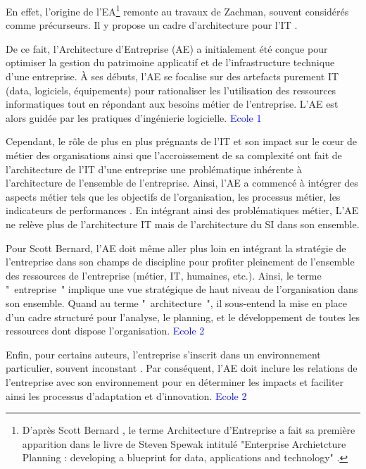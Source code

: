 En effet, l'origine de l'EA\footnote{D'après Scott Bernard 
\cite{bernard2012introduction}, le terme Architecture d'Entreprise a fait sa 
première apparition dans le livre de Steven Spewak intitulé "Enterprise 
Archietcture Planning : developing a blueprint for data, applications and 
technology" \cite{spewak1993enterprise}.} remonte au travaux de Zachman, souvent 
considérés comme précurseurs. Il y propose un cadre d'architecture pour l'IT 
\cite{zachman1987framework}.

De ce fait, l'Architecture d'Entreprise (AE) a initialement été conçue pour 
optimiser la 
gestion du patrimoine applicatif et de l'infrastructure technique d'une  
entreprise. À ses débuts, l'AE se 
focalise sur des artefacts purement IT (data, logiciels, équipements) pour 
rationaliser les l'utilisation des ressources informatiques 
\cite{winter2006essential} tout en répondant aux besoins métier de l'entreprise. 
L'AE est alors guidée par les pratiques d'ingénierie logicielle. 
\textcolor{blue}{Ecole 1} 
 

Cependant, le rôle de plus en plus prégnants de l'IT et son impact sur le 
c\oe{}ur de métier des organisations ainsi que l'accroissement de sa complexité 
\cite{ranganathan2005enterprise} ont fait de l'architecture de l'IT d'une 
entreprise une problématique inhérente à l'architecture de l'ensemble de 
l'entreprise. Ainsi, l'AE a commencé à intégrer des aspects métier tels que les 
objectifs de l'organisation, les processus métier, les indicateurs de 
performances \cite{winter2006essential}. En intégrant ainsi des problématiques 
métier, L'AE ne relève plus de l'architecture IT mais de l'architecture du SI 
dans son ensemble.

Pour Scott Bernard, l'AE doit même aller plus loin en intégrant la stratégie de 
l'entreprise \cite{bernard2012introduction} dans son champs de discipline pour 
profiter pleinement de l'ensemble des ressources de l'entreprise (métier, IT, 
humaines, etc.). Ainsi, le terme "~entreprise~" implique une vue stratégique de 
haut niveau de l'organisation dans son ensemble. Quand au terme 
"~architecture~", il sous-entend la mise en place d'un cadre structuré pour 
l'analyse, le planning, et le développement de toutes les ressources dont 
dispose l'organisation. \textcolor{blue}{Ecole 2} 

Enfin, pour certains auteurs, l'entreprise s'inscrit dans un environnement 
particulier, souvent inconstant \cite{lapalme2012three}. Par conséquent, l'AE 
doit inclure les relations de l'entreprise avec son environnement pour en 
déterminer les impacts et faciliter ainsi les processus d'adaptation  et 
d'innovation. \textcolor{blue}{Ecole 2}



